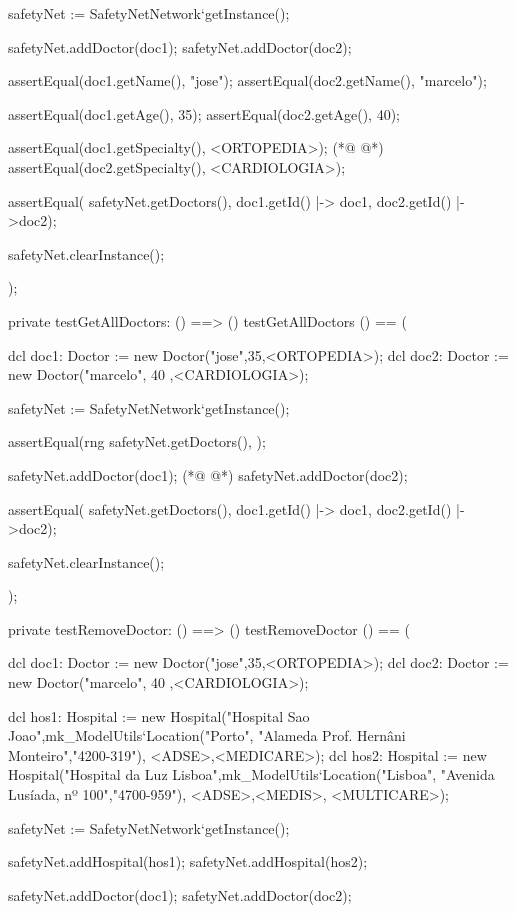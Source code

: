 \begin{vdmpp}[breaklines=true]
  safetyNet := SafetyNetNetwork`getInstance();
   
  safetyNet.addDoctor(doc1);
  safetyNet.addDoctor(doc2);
  
  assertEqual(doc1.getName(), "jose");
  assertEqual(doc2.getName(), "marcelo");
  
  assertEqual(doc1.getAge(), 35);
  assertEqual(doc2.getAge(), 40); 
  
  assertEqual(doc1.getSpecialty(), <ORTOPEDIA>);
(*@
\label{testGetAllDoctors:163}
@*)
  assertEqual(doc2.getSpecialty(), <CARDIOLOGIA>);
  
  assertEqual( safetyNet.getDoctors(), {doc1.getId() |-> doc1, doc2.getId() |->doc2});
  
  safetyNet.clearInstance();
    
);

private testGetAllDoctors: () ==> ()
 testGetAllDoctors () == (
  
  dcl doc1: Doctor := new Doctor("jose",35,<ORTOPEDIA>);
  dcl doc2: Doctor := new Doctor("marcelo", 40 ,<CARDIOLOGIA>);
  
  safetyNet := SafetyNetNetwork`getInstance();

  assertEqual(rng safetyNet.getDoctors(), {});
   
  safetyNet.addDoctor(doc1);
(*@
\label{testRemoveDoctor:182}
@*)
  safetyNet.addDoctor(doc2);

  assertEqual( safetyNet.getDoctors(), {doc1.getId() |-> doc1, doc2.getId() |->doc2});
  
  safetyNet.clearInstance();
    
);

private testRemoveDoctor: () ==> ()
 testRemoveDoctor () == (
  
  dcl doc1: Doctor := new Doctor("jose",35,<ORTOPEDIA>);
  dcl doc2: Doctor := new Doctor("marcelo", 40 ,<CARDIOLOGIA>);
  
  dcl hos1: Hospital := new Hospital("Hospital Sao Joao",mk_ModelUtils`Location("Porto", "Alameda Prof. Hernâni Monteiro","4200-319"), {<ADSE>,<MEDICARE>});
  dcl hos2: Hospital := new Hospital("Hospital da Luz Lisboa",mk_ModelUtils`Location("Lisboa", "Avenida Lusíada, nº 100","4700-959"), {<ADSE>,<MEDIS>, <MULTICARE>});
  
  safetyNet := SafetyNetNetwork`getInstance();
   
  safetyNet.addHospital(hos1);
  safetyNet.addHospital(hos2);
   
  safetyNet.addDoctor(doc1);
  safetyNet.addDoctor(doc2);
  

\end{vdmpp}
